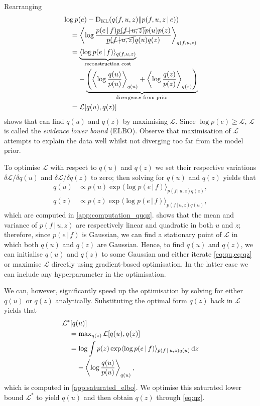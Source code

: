 \documentclass{article}
\renewcommand{\max}{\operatorname{max}}
\newcommand{\KL}{\operatorname{D}_{\text{KL}}}
\newcommand{\id}[1]{\, \mathrm{d} #1}     %
\newcommand{\cond}{\, | \,}               %
\renewcommand{\ll}{\left}
\newcommand{\rr}{\right}
\newcommand{\la}{\langle}
\newcommand{\ra}{\rangle}
\newcommand{\phan}[1]{\hphantom{#1\;}}
\begin{document}
Rearranging
\begin{align*}
    &\log p(e) - \KL(q(f,u,z)\|p(f,u,z\cond e)) \\
    &\quad= \ll\la \log \frac{p(e\cond f)\cancel{p(f\cond u, z)}p(u)p(z)}{\cancel{p(f\cond u, z)}q(u)q(z)} \rr\ra_{q(f,u,z)} \\
    &\quad= \underbrace{\la \log p(e\cond f) \ra_{q(f,u,z)}}_{\text{reconstruction cost}} \\
    &\quad\phan{=}- \underbrace{\ll(\ll\la\log\frac{q(u)}{p(u)}\rr\ra_{q(u)} + \ll\la\log\frac{q(z)}{p(z)}\rr\ra_{q(z)}\rr)}_{\text{divergence from prior}} \\
    &\quad=\mathcal{L}[q(u),q(z)]
\end{align*}
shows that can find $q(u)$ and $q(z)$ by maximising $\mathcal{L}$. Since $\log p(e)\ge\mathcal{L}$, $\mathcal{L}$ is called the \textit{evidence lower bound} (ELBO). Observe that maximisation of $\mathcal{L}$ attempts to explain the data well whilst not diverging too far from the model prior.

To optimise $\mathcal{L}$ with respect to $q(u)$ and $q(z)$ we set their respective variations $\delta \mathcal{L} / \delta q(u)$ and $\delta \mathcal{L} / \delta q(z)$ to zero; then solving for $q(u)$ and $q(z)$ yields that
\begin{align}
    q(u) &\propto p(u) \exp \la \log p(e\cond f) \ra_{p(f\cond u,z)q(z)}, \label{eq:qu} \\
    q(z) &\propto p(z) \exp \la \log p(e\cond f) \ra_{p(f\cond u,z)q(u)}, \label{eq:qz}
\end{align}
which are computed in \cref{app:computation_quqz}.
 shows that the mean and variance of $p(f\cond u, z)$ are respectively linear and quadratic in both $u$ and $z$; therefore, since $p(e\cond f)$ is Gaussian, we can find a stationary point of $\mathcal{L}$ in which both $q(u)$ and $q(z)$ are Gaussian. Hence, to find $q(u)$ and $q(z)$, we can initialise $q(u)$ and $q(z)$ to some Gaussian and either iterate \cref{eq:qu,eq:qz} or maximise $\mathcal{L}$ directly using gradient-based optimisation. In the latter case we can include any hyperparameter in the optimisation.

We can, however, significantly speed up the optimisation by solving for either $q(u)$ or $q(z)$ analytically. Substituting the optimal form $q(z)$ back in $\mathcal{L}$ yields that
\begin{align}
    &\mathcal{L}^*[q(u)] \nonumber\\
    &\quad=\max_{q(z)} \mathcal{L}[q(u),q(z)]\nonumber\\
    &\quad= \log \int p(z)\exp \la \log p(e\cond f) \ra_{p(f\cond u, z)q(u)} \id{z} \nonumber\\
    &\quad\phan{=}-\ll\la\log\frac{q(u)}{p(u)}\rr\ra_{q(u)},\label{eq:saturated_elbo}
\end{align}
which is computed in \cref{app:saturated_elbo}. We optimise this saturated lower bound $\mathcal{L}^*$ to yield $q(u)$ and then obtain $q(z)$ through \cref{eq:qz}.
\end{document}
